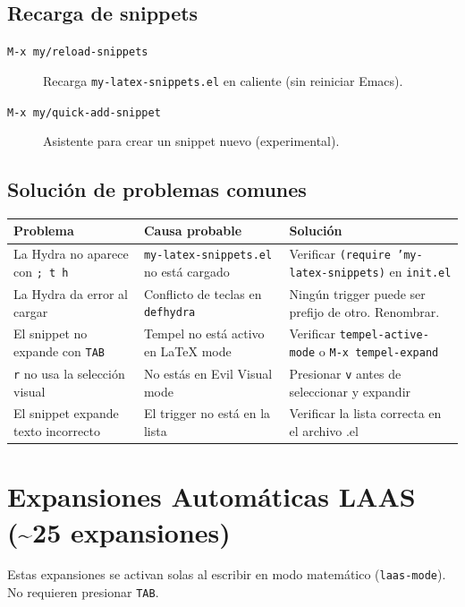 \documentclass[11pt]{article}
\begin{document}
\subsection{Recarga de snippets}
\label{sec:org1944855}

\begin{description}
\item[{\texttt{M-x my/reload-snippets}}] Recarga \texttt{my-latex-snippets.el} en caliente (sin reiniciar Emacs).
\item[{\texttt{M-x my/quick-add-snippet}}] Asistente para crear un snippet nuevo (experimental).
\end{description}
\subsection{Solución de problemas comunes}
\label{sec:org01ca996}

\begin{center}
\begin{tabular}{lll}
Problema & Causa probable & Solución\\
\hline
La Hydra no aparece con \texttt{; t h} & \texttt{my-latex-snippets.el} no está cargado & Verificar \texttt{(require 'my-latex-snippets)} en \texttt{init.el}\\
La Hydra da error al cargar & Conflicto de teclas en \texttt{defhydra} & Ningún trigger puede ser prefijo de otro. Renombrar.\\
El snippet no expande con \texttt{TAB} & Tempel no está activo en \LaTeX{} mode & Verificar \texttt{tempel-active-mode} o \texttt{M-x tempel-expand}\\
\texttt{r} no usa la selección visual & No estás en Evil Visual mode & Presionar \texttt{v} antes de seleccionar y expandir\\
El snippet expande texto incorrecto & El trigger no está en la lista & Verificar la lista correcta en el archivo .el\\
\end{tabular}
\end{center}
\section{Expansiones Automáticas LAAS (\textasciitilde{}25 expansiones)}
\label{sec:orgbf15063}

Estas expansiones se activan solas al escribir en modo matemático (\texttt{laas-mode}). No requieren presionar \texttt{TAB}.
\end{document}
